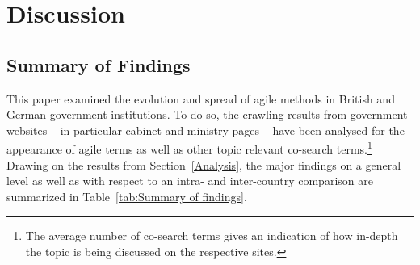 \section{Discussion}\label{Discussion}
\subsection{Summary of Findings}\label{Summary of Findings}
This paper examined the evolution and spread of agile methods in British and German government institutions. To do so, the crawling results from government websites – in particular cabinet and ministry pages – have been analysed for the appearance of agile terms as well as other topic relevant co-search terms.\footnote{The average number of co-search terms gives an indication of how in-depth the topic is being discussed on the respective sites.} Drawing on the results from Section~\ref{Analysis}, the major findings on a general level as well as with respect to an intra- and inter-country comparison are summarized in Table~\ref{tab:Summary of findings}.

